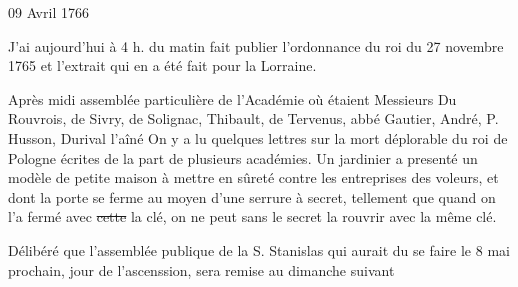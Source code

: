                      \begin{diary}{09 Avril 1766}{}
                        
                         J'ai aujourd'hui à 4 h. du matin fait
                           publier l'ordonnance du roi du 27 novembre 1765
                           et l'extrait qui en a été fait pour la
                              Lorraine. \bigskip
        
        
                         Après midi assemblée particulière de
                              l'Académie
                           où étaient Messieurs
                           Du Rouvrois, de Sivry, de
                              Solignac, Thibault, de
                           Tervenus, abbé
                              Gautier, André,
                              P. Husson, Durival l'aîné
                           On y a lu quelques lettres sur la mort
                           déplorable du roi de Pologne écrites de la part
                           de plusieurs  académies. Un jardinier a presenté
                           un modèle de petite maison à mettre en sûreté
                           contre les entreprises des voleurs, et dont la porte se ferme au moyen d'une serrure à
                           secret, tellement que quand on l'a fermé avec
                           \sout{cette} la clé, on ne peut sans le
                           secret la
                           rouvrir avec la même clé. \bigskip
        
        
                         Délibéré que l'assemblée publique de la
                           S. Stanislas qui aurait du se faire le
                           8 mai prochain, jour de l'ascenssion,
                           sera
                           remise au dimanche suivant \bigskip
        
        
                     \end{diary}

